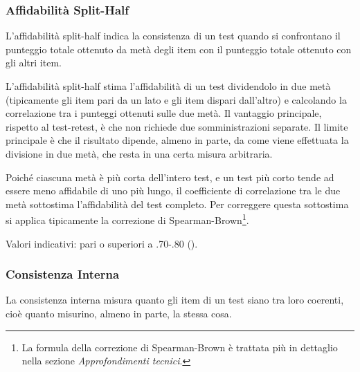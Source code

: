 \documentclass[
  italian,
  letterpaper,
  paper=A4,
  headinclude=on,
  footinclude=on,
  12pt]{scrbook}
\begin{document}
\subsubsection{Affidabilità
Split-Half}\label{affidabilituxe0-split-half}

\begin{tcolorbox}[enhanced jigsaw, left=2mm, colbacktitle=quarto-callout-note-color!10!white, bottomrule=.15mm, opacityback=0, coltitle=black, colframe=quarto-callout-note-color-frame, opacitybacktitle=0.6, leftrule=.75mm, colback=white, toprule=.15mm, title=\textcolor{quarto-callout-note-color}{\faInfo}\hspace{0.5em}{Definizione}, titlerule=0mm, arc=.35mm, breakable, rightrule=.15mm, bottomtitle=1mm, toptitle=1mm]

L'affidabilità split-half indica la consistenza di un test quando si
confrontano il punteggio totale ottenuto da metà degli item con il
punteggio totale ottenuto con gli altri item.

\end{tcolorbox}

L'affidabilità split-half stima l'affidabilità di un test dividendolo in
due metà (tipicamente gli item pari da un lato e gli item dispari
dall'altro) e calcolando la correlazione tra i punteggi ottenuti sulle
due metà. Il vantaggio principale, rispetto al test-retest, è che non
richiede due somministrazioni separate. Il limite principale è che il
risultato dipende, almeno in parte, da come viene effettuata la
divisione in due metà, che resta in una certa misura arbitraria.

Poiché ciascuna metà è più corta dell'intero test, e un test più corto
tende ad essere meno affidabile di uno più lungo, il coefficiente di
correlazione tra le due metà sottostima l'affidabilità del test
completo. Per correggere questa sottostima si applica tipicamente la
correzione di Spearman-Brown\footnote{La formula della correzione di
  Spearman-Brown è trattata più in dettaglio nella sezione
  \emph{Approfondimenti tecnici}.}.

Valori indicativi: pari o superiori a .70-.80
(\cite{slick2006psychometrics}).

\subsubsection{Consistenza Interna}\label{consistenza-interna}

\begin{tcolorbox}[enhanced jigsaw, left=2mm, colbacktitle=quarto-callout-note-color!10!white, bottomrule=.15mm, opacityback=0, coltitle=black, colframe=quarto-callout-note-color-frame, opacitybacktitle=0.6, leftrule=.75mm, colback=white, toprule=.15mm, title=\textcolor{quarto-callout-note-color}{\faInfo}\hspace{0.5em}{Definizione}, titlerule=0mm, arc=.35mm, breakable, rightrule=.15mm, bottomtitle=1mm, toptitle=1mm]

La consistenza interna misura quanto gli item di un test siano tra loro
coerenti, cioè quanto misurino, almeno in parte, la stessa cosa.

\end{tcolorbox}
\end{document}
